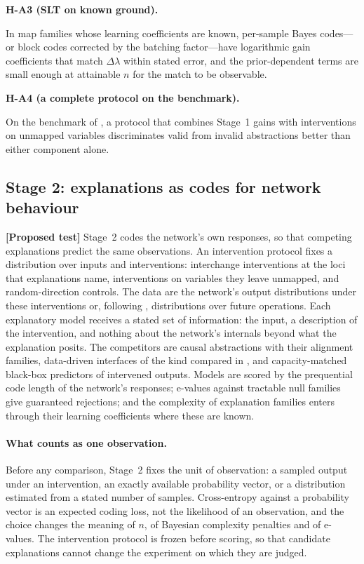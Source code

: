 \documentclass[11pt,a4paper]{article}
\newcommand{\evl}[2]{{\small\bfseries\color{#1}[#2]}}
\newcommand{\LTest}{\evl{ctest}{Proposed test}}
\newenvironment{hypbox}[1]{%
  \def\FrameCommand{{\color{chyp}\vrule width 1.6pt}\hspace{8pt}}%
  \MakeFramed{\advance\hsize-\width\FrameRestore}%
  \noindent\textbf{#1}\par\smallskip\noindent\ignorespaces}{\endMakeFramed}
\begin{document}
\begin{hypbox}{H-A3 (SLT on known ground).}
In map families whose learning coefficients are known, per-sample Bayes
codes---or block codes corrected by the batching factor---have logarithmic
gain coefficients that match $\Delta\lambda$ within stated error, and the
prior-dependent terms are small enough at attainable $n$ for the match to
be observable.
\end{hypbox}

\begin{hypbox}{H-A4 (a complete protocol on the benchmark).}
On the benchmark of \cite{meloux2026}, a protocol that combines Stage~1
gains with interventions on unmapped variables discriminates valid from
invalid abstractions better than either component alone.
\end{hypbox}

\subsection{Stage 2: explanations as codes for network behaviour}
\label{sec:a1a2}

\LTest{} Stage~2 codes the network's own responses, so that competing
explanations predict the same observations. An intervention protocol fixes
a distribution over inputs and interventions: interchange interventions at
the loci that explanations name, interventions on variables they leave
unmapped, and random-direction controls. The data are the network's output
distributions under these interventions or, following \cite{ma2026},
distributions over future operations. Each explanatory model receives a
stated set of information: the input, a description of the intervention,
and nothing about the network's internals beyond what the explanation
posits. The competitors are causal abstractions with their alignment
families, data-driven interfaces of the kind compared in \cite{ma2026},
and capacity-matched black-box predictors of intervened outputs. Models
are scored by the prequential code length of the network's responses;
e-values against tractable null families give guaranteed rejections; and
the complexity of explanation families enters through their learning
coefficients where these are known.

\paragraph{What counts as one observation.} Before any comparison, Stage~2
fixes the unit of observation: a sampled output under an intervention, an
exactly available probability vector, or a distribution estimated from a
stated number of samples. Cross-entropy against a probability vector is an
expected coding loss, not the likelihood of an observation, and the choice
changes the meaning of $n$, of Bayesian complexity penalties and of
e-values. The intervention protocol is frozen before scoring, so that
candidate explanations cannot change the experiment on which they are
judged.
\end{document}
